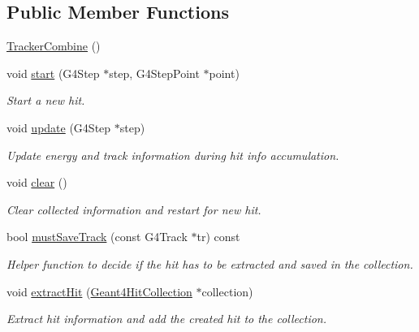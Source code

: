 \subsection*{Public Member Functions}
\begin{DoxyCompactItemize}
\item 
\hyperlink{struct_d_d4hep_1_1_simulation_1_1_tracker_combine_a60747607cdefc8283d864c6f5313a392}{Tracker\+Combine} ()
\item 
void \hyperlink{struct_d_d4hep_1_1_simulation_1_1_tracker_combine_a104188fb9a41662e03eacc2d34e4bced}{start} (G4\+Step $\ast$step, G4\+Step\+Point $\ast$point)
\begin{DoxyCompactList}\small\item\em Start a new hit. \end{DoxyCompactList}\item 
void \hyperlink{struct_d_d4hep_1_1_simulation_1_1_tracker_combine_a3bd30148dcc0b7fa917b000c9946e77f}{update} (G4\+Step $\ast$step)
\begin{DoxyCompactList}\small\item\em Update energy and track information during hit info accumulation. \end{DoxyCompactList}\item 
void \hyperlink{struct_d_d4hep_1_1_simulation_1_1_tracker_combine_a7b178cd57d961437d3cfabb65d9c2d09}{clear} ()
\begin{DoxyCompactList}\small\item\em Clear collected information and restart for new hit. \end{DoxyCompactList}\item 
bool \hyperlink{struct_d_d4hep_1_1_simulation_1_1_tracker_combine_a911a9e157f1510b61cc2220ed918371b}{must\+Save\+Track} (const G4\+Track $\ast$tr) const
\begin{DoxyCompactList}\small\item\em Helper function to decide if the hit has to be extracted and saved in the collection. \end{DoxyCompactList}\item 
void \hyperlink{struct_d_d4hep_1_1_simulation_1_1_tracker_combine_a75803adf3212ecca99d2b6fbcd53899f}{extract\+Hit} (\hyperlink{class_d_d4hep_1_1_simulation_1_1_geant4_hit_collection}{Geant4\+Hit\+Collection} $\ast$collection)
\begin{DoxyCompactList}\small\item\em Extract hit information and add the created hit to the collection. \end{DoxyCompactList}\item 

\end{DoxyCompactItemize}
